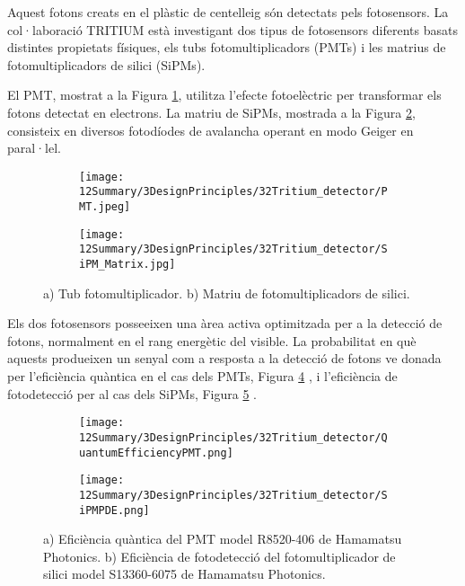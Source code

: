 Aquest fotons creats en el plàstic de centelleig són detectats pels fotosensors. La col·laboració TRITIUM està investigant dos tipus de fotosensors diferents basats distintes propietats físiques, els tubs fotomultiplicadors (PMTs) i les matrius de fotomultiplicadors de silici (SiPMs).

El PMT, mostrat a la Figura \ref{subfig:PMT}, utilitza l'efecte fotoelèctric per transformar els fotons detectat en electrons. La matriu de SiPMs, mostrada a la Figura \ref{subfig:SiPM}, consisteix en diversos fotodíodes de avalancha operant en modo Geiger en paral·lel.

\begin{figure}[htpb]
\centering
    \begin{subfigure}[b]{0.4\textwidth}
    \centering
    \texttt{[image: 12Summary/3DesignPrinciples/32Tritium\_detector/PMT.jpeg]}  
    \caption{\label{subfig:PMT}}
    \end{subfigure}
    \hfill
    \begin{subfigure}[b]{0.4\textwidth}
    \centering
    \texttt{[image: 12Summary/3DesignPrinciples/32Tritium\_detector/SiPM\_Matrix.jpg]}  
    \caption{\label{subfig:SiPM}}
    \end{subfigure}
 \caption{a) Tub fotomultiplicador. b) Matriu de fotomultiplicadors de silici.}
 \label{fig:Fotosensors}
\end{figure}

Els dos fotosensors posseeixen una àrea activa optimitzada per a la detecció de fotons, normalment en el rang energètic del visible. La probabilitat en què aquests produeixen un senyal com a resposta a la detecció de fotons ve donada per l'eficiència quàntica en el cas dels PMTs, Figura \ref{subfig:QEPMT} \cite{DataSheetPMTs}, i l'eficiència de fotodetecció per al cas dels SiPMs, Figura \ref{subfig:PDESiPM} \cite{DataSheetHammamatsu_1_SiPM_1375}.

\begin{figure}[htpb]
\centering
    \begin{subfigure}[b]{0.45\textwidth}
    \centering
    \texttt{[image: 12Summary/3DesignPrinciples/32Tritium\_detector/QuantumEfficiencyPMT.png]}  
    \caption{\label{subfig:QEPMT}}
    \end{subfigure}
    \hfill
    \begin{subfigure}[b]{0.45\textwidth}
    \centering
    \texttt{[image: 12Summary/3DesignPrinciples/32Tritium\_detector/SiPMPDE.png]}  
    \caption{\label{subfig:PDESiPM}}
    \end{subfigure}
 \caption{a) Eficiència quàntica del PMT model R8520-406 de Hamamatsu Photonics. b) Eficiència de fotodetecció del fotomultiplicador de silici model S13360-6075 de Hamamatsu Photonics.}
 \label{fig:EficienciaFotosensors}
\end{figure}

